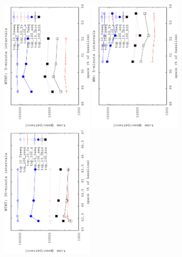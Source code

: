 	\begin{figure}[ht]
		\begin{center}
			{\includegraphics[angle=-90,width=0.4\textwidth]{figures_synt/porto_st_topk_ht_5.eps}}
			{\includegraphics[angle=-90,width=0.4\textwidth]{figures_synt/porto_st_topk_wm_5.eps}}
			{\includegraphics[angle=-90,width=0.4\textwidth]{figures_synt/porto_st_topk_ht_30.eps}}

\end{center}
\end{figure}
